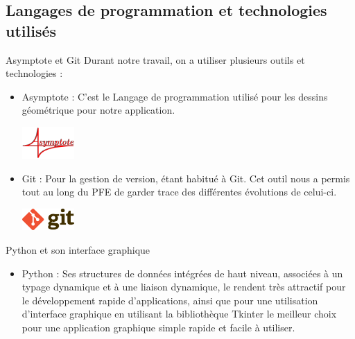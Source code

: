 \documentclass{beamer}
\begin{document}
\subsection{Langages de programmation et technologies utilisés}
\begin{frame}{Asymptote et Git}
Durant notre travail, on a utiliser plusieurs outils et technologies :\pause
\begin{itemize}
\item Asymptote : C'est le Langage de programmation utilisé pour les dessins géométrique pour notre application. 
\begin{center}
    \includegraphics[width=2cm]{pic/asylogo.png}
\end{center}\pause
\item Git : Pour la gestion de version, étant habitué à Git. Cet outil nous a permis tout au long du PFE de garder trace des différentes évolutions de celui-ci.
\begin{center}
    \includegraphics[width=2cm]{pic/git.png}
\end{center}
\end{itemize}
\end{frame}
\begin{frame}{Python et son interface graphique}
\begin{itemize}
\item Python : Ses structures de données intégrées de haut niveau, associées à un typage dynamique et à une liaison dynamique, le rendent très attractif pour le développement rapide d'applications, ainsi que pour une utilisation d'interface graphique en utilisant la bibliothèque Tkinter le meilleur choix pour une application graphique simple rapide et facile à utiliser.
\end{itemize}
\end{frame}
\end{document}
